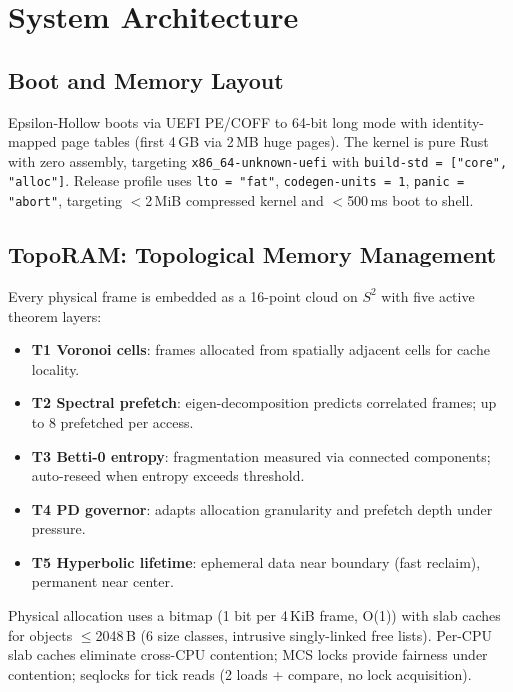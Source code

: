 \documentclass[11pt, a4paper]{article}
\theoremstyle{proofform}
\numberwithin{innerpoints}{subsection}
\numberwithin{disproof}{subsection}
\theoremstyle{mathproof}
\begin{document}
\section{System Architecture}
\label{sec:architecture}

\subsection{Boot and Memory Layout}

Epsilon-Hollow boots via UEFI PE/COFF to 64-bit long mode with identity-mapped page tables (first 4\,GB via 2\,MB huge pages). The kernel is pure Rust with zero assembly, targeting \texttt{x86\_64-unknown-uefi} with \texttt{build-std = ["core", "alloc"]}. Release profile uses \texttt{lto = "fat"}, \texttt{codegen-units = 1}, \texttt{panic = "abort"}, targeting $<$2\,MiB compressed kernel and $<$500\,ms boot to shell.

\subsection{TopoRAM: Topological Memory Management}

Every physical frame is embedded as a 16-point cloud on $S^2$ with five active theorem layers:

\begin{itemize}[nosep]
  \item \textbf{T1 Voronoi cells}: frames allocated from spatially adjacent cells for cache locality.
  \item \textbf{T2 Spectral prefetch}: eigen-decomposition predicts correlated frames; up to 8 prefetched per access.
  \item \textbf{T3 Betti-0 entropy}: fragmentation measured via connected components; auto-reseed when entropy exceeds threshold.
  \item \textbf{T4 PD governor}: adapts allocation granularity and prefetch depth under pressure.
  \item \textbf{T5 Hyperbolic lifetime}: ephemeral data near boundary (fast reclaim), permanent near center.
\end{itemize}

Physical allocation uses a bitmap (1 bit per 4\,KiB frame, O(1)) with slab caches for objects $\leq$2048\,B (6 size classes, intrusive singly-linked free lists). Per-CPU slab caches eliminate cross-CPU contention; MCS locks provide fairness under contention; seqlocks for tick reads (2 loads + compare, no lock acquisition).
\end{document}
